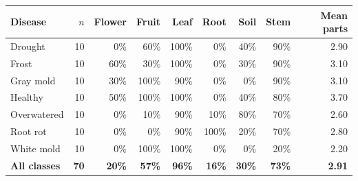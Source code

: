\begin{tabular}{lrrrrrrrr}
\toprule
Disease & $n$ & Flower & Fruit & Leaf & Root & Soil & Stem & Mean parts \\
\midrule
Drought & 10 & 0\% & 60\% & 100\% & 0\% & 40\% & 90\% & 2.90 \\
Frost & 10 & 60\% & 30\% & 100\% & 0\% & 30\% & 90\% & 3.10 \\
Gray mold & 10 & 30\% & 100\% & 90\% & 0\% & 0\% & 90\% & 3.10 \\
Healthy & 10 & 50\% & 100\% & 100\% & 0\% & 40\% & 80\% & 3.70 \\
Overwatered & 10 & 0\% & 10\% & 90\% & 10\% & 80\% & 70\% & 2.60 \\
Root rot & 10 & 0\% & 0\% & 90\% & 100\% & 20\% & 70\% & 2.80 \\
White mold & 10 & 0\% & 100\% & 100\% & 0\% & 0\% & 20\% & 2.20 \\
\textbf{All classes} & \textbf{70} & \textbf{20\%} & \textbf{57\%} & \textbf{96\%} & \textbf{16\%} & \textbf{30\%} & \textbf{73\%} & \textbf{2.91} \\
\bottomrule
\end{tabular}
